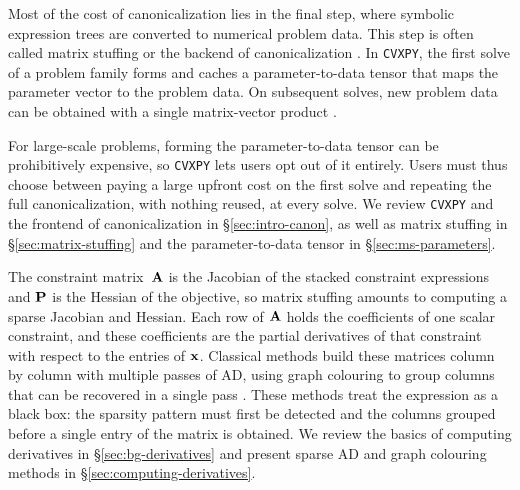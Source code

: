 Most of the cost of canonicalization lies in the final step, where symbolic
expression trees are converted to numerical problem data.
This step is often called matrix stuffing or the backend of canonicalization
\cite{zhang2026cvxpy}.
In \texttt{CVXPY}, the first solve of a problem family forms and caches a
parameter-to-data tensor that maps the parameter vector to the problem data.
On subsequent solves, new problem data can be obtained with a single matrix-vector product
\cite{agrawal2019dpp}.

For large-scale problems, forming the parameter-to-data tensor can be prohibitively expensive, so
\texttt{CVXPY} lets users opt out of it entirely.
Users must thus choose between paying a large upfront cost on the first solve and repeating
the full canonicalization, with nothing reused, at every solve.
We review \texttt{CVXPY} and the frontend of canonicalization in \S\ref{sec:intro-canon},
as well as matrix stuffing in \S\ref{sec:matrix-stuffing} and the parameter-to-data tensor
in \S\ref{sec:ms-parameters}.

The constraint matrix~$\mathbf{A}$ is the Jacobian of the stacked constraint expressions and
$\mathbf{P}$ is the
Hessian of the objective, so matrix stuffing amounts to computing a sparse Jacobian and Hessian.
Each row of $\mathbf{A}$ holds the coefficients of one scalar constraint, and these coefficients
are the partial derivatives of that constraint with respect to the entries of $\mathbf{x}$.
Classical methods build these matrices column by column with multiple passes of \ac{AD},
using graph colouring to group columns that can be recovered in a single
pass \cite{curtis1974estimation, gebremedhin2005color}.
These methods treat the expression as a black box: the sparsity pattern must first be
detected and the columns grouped before a single entry of the matrix is obtained.
We review the basics of computing derivatives in \S\ref{sec:bg-derivatives} and present
sparse AD and graph colouring methods in \S\ref{sec:computing-derivatives}.

